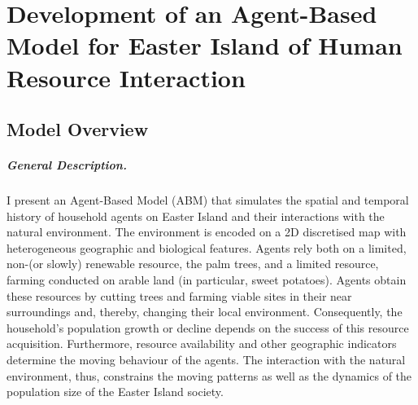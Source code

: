 \chapter{Development of an Agent-Based Model for Easter Island of Human Resource Interaction}\label{chapter:Methods}
\FloatBarrier
\section{Model Overview}
\paragraph{General Description.}
I present an Agent-Based Model (ABM) that simulates the spatial and temporal history of household agents on Easter Island and their interactions with the natural environment. 
The environment is encoded on a 2D discretised map with heterogeneous geographic and biological features.
Agents rely both on a limited, non-(or slowly) renewable resource, the palm trees, and a limited resource, farming conducted on arable land (in particular, sweet potatoes).
Agents obtain these resources by cutting trees and farming viable sites in their near surroundings and, thereby, changing their local environment.
Consequently, the household's population growth or decline depends on the success of this resource acquisition. 
Furthermore, resource availability and other geographic indicators determine the moving behaviour of the agents.
The interaction with the natural environment, thus, constrains the moving patterns as well as the dynamics of the population size of the Easter Island society.

